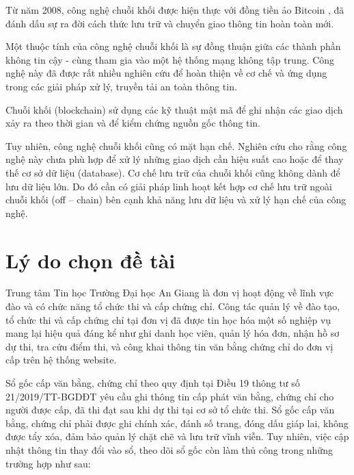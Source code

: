 Từ năm 2008, công nghệ chuỗi khối được hiện thực với đồng tiền ảo Bitcoin \cite{nakamoto2008bitcoin}, đã đánh dấu sự ra đời cách thức lưu trữ và chuyển giao thông tin hoàn toàn mới.

Một thuộc tính của công nghệ chuỗi khối là sự đồng thuận giữa các thành phần không tin cậy - cùng tham gia vào một hệ thống mạng không tập trung. Công nghệ này đã được rất nhiều nghiên cứu \cite{10.1145/3190508.3190538, ANTWI2021100012, fair2019, 8246573, Fang2020} để hoàn thiện về cơ chế và ứng dụng trong các giải pháp xử lý, truyền tải an toàn thông tin.

Chuỗi khối (blockchain) sử dụng các kỹ thuật mật mã \cite{lequyetthang2016, christofpaar2015, ralphcharlesmerkle1979, shannon-otp} để ghi nhận các giao dịch xảy ra theo thời gian và để kiểm chứng nguồn gốc thông tin.

Tuy nhiên, công nghệ chuỗi khối cũng có mặt hạn chế.
Nghiên cứu \cite{CHEN20191122} cho rằng công nghệ này chưa phù hợp để xử lý những giao dịch cần hiệu suất cao hoặc để thay thế cơ sở dữ liệu (database).
Cơ chế lưu trữ của chuỗi khối cũng không dành để lưu dữ liệu lớn.
Do đó cần có giải pháp linh hoạt kết hợp cơ chế lưu trữ ngoài chuỗi khối (off -- chain) bên cạnh khả năng lưu dữ liệu và xử lý hạn chế của công nghệ.

\section{Lý do chọn đề tài}

Trung tâm Tin học Trường Đại học An Giang là đơn vị hoạt động về lĩnh vực đào và có chức năng tổ chức thi và cấp chứng chỉ.
Công tác quản lý về đào tạo, tổ chức thi và cấp chứng chỉ tại đơn vị đã được tin học hóa một số nghiệp vụ mang lại hiệu quả đáng kể như ghi danh học viên, quản lý hóa đơn, nhận hồ sơ dự thi, tra cứu điểm thi, và công khai thông tin văn bằng chứng chỉ do đơn vị cấp trên hệ thống website.

Sổ gốc cấp văn bằng, chứng chỉ theo quy định tại Điều 19 thông tư số 21/2019/TT-BGDĐT yêu cầu ghi thông tin cấp phát văn bằng, chứng chỉ cho người được cấp, đã thi đạt sau khi dự thi tại cơ sở tổ chức thi. Sổ gốc cấp văn bằng, chứng chỉ phải được ghi chính xác, đánh số trang, đóng dấu giáp lai, không được tẩy xóa, đảm bảo quản lý chặt chẽ và lưu trữ vĩnh viễn. Tuy nhiên, việc cập nhật thông tin thay đổi vào sổ, theo dõi sổ gốc còn làm thủ công trong những trường hợp như sau:

